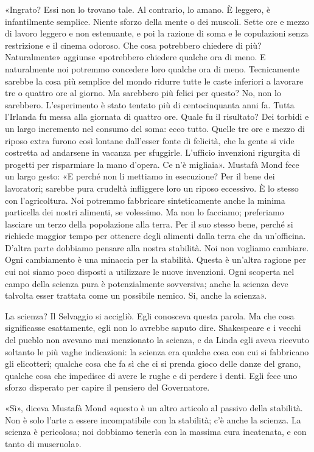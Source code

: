 \documentclass[
a5paper, %
10pt, %
twoside, 
onecolumn, %
openany, %
]{memoir}
\begin{document}
«Ingrato? Essi non lo trovano tale. Al contrario, lo amano. È leggero, è infantilmente semplice. Niente sforzo della mente o dei muscoli. Sette ore e mezzo di lavoro leggero e non estenuante, e poi la razione di soma e le copulazioni senza restrizione e il cinema odoroso. Che cosa potrebbero chiedere di più? Naturalmente» aggiunse «potrebbero chiedere qualche ora di meno. E naturalmente noi potremmo concedere loro qualche ora di meno. Tecnicamente sarebbe la cosa più semplice del mondo ridurre tutte le caste inferiori a lavorare tre o quattro ore al giorno. Ma sarebbero più felici per questo? No, non lo sarebbero. L’esperimento è stato tentato più di centocinquanta anni fa. Tutta l’Irlanda fu messa alla giornata di quattro ore. Quale fu il risultato? Dei torbidi e un largo incremento nel consumo del soma: ecco tutto. Quelle tre ore e mezzo di riposo extra furono così lontane dall’esser fonte di felicità, che la gente si vide costretta ad andarsene in vacanza per sfuggirle. L’ufficio invenzioni rigurgita di progetti per risparmiare la mano d’opera. Ce n’è migliaia». Mustafà Mond fece un largo gesto: «E perché non li mettiamo in esecuzione? Per il bene dei lavoratori; sarebbe pura crudeltà infliggere loro un riposo eccessivo. È lo stesso con l’agricoltura. Noi potremmo fabbricare sinteticamente anche la minima particella dei nostri alimenti, se volessimo. Ma non lo facciamo; preferiamo lasciare un terzo della popolazione alla terra. Per il suo stesso bene, perché si richiede maggior tempo per ottenere degli alimenti dalla terra che da un’officina. D’altra parte dobbiamo pensare alla nostra stabilità. Noi non vogliamo cambiare. Ogni cambiamento è una minaccia per la stabilità. Questa è un’altra ragione per cui noi siamo poco disposti a utilizzare le nuove invenzioni. Ogni scoperta nel campo della scienza pura è potenzialmente sovversiva; anche la scienza deve talvolta esser trattata come un possibile nemico. Si, anche la scienza».

La scienza? Il Selvaggio si accigliò. Egli conosceva questa parola. Ma che cosa significasse esattamente, egli non lo avrebbe saputo dire. Shakespeare e i vecchi del pueblo non avevano mai menzionato la scienza, e da Linda egli aveva ricevuto soltanto le più vaghe indicazioni: la scienza era qualche cosa con cui si fabbricano gli elicotteri; qualche cosa che fa sì che ci si prenda gioco delle danze del grano, qualche cosa che impedisce di avere le rughe e di perdere i denti. Egli fece uno sforzo disperato per capire il pensiero del Governatore.

«Sì», diceva Mustafà Mond «questo è un altro articolo al passivo della stabilità. Non è solo l’arte a essere incompatibile con la stabilità; c’è anche la scienza. La scienza è pericolosa; noi dobbiamo tenerla con la massima cura incatenata, e con tanto di museruola».
\end{document}
